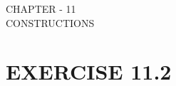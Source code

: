 \documentclass{article}
\begin{document}
\begin{center}
\textbf\large{CHAPTER - 11 \\ CONSTRUCTIONS}
\section*{EXERCISE 11.2}
\end{center}
\end{document}
